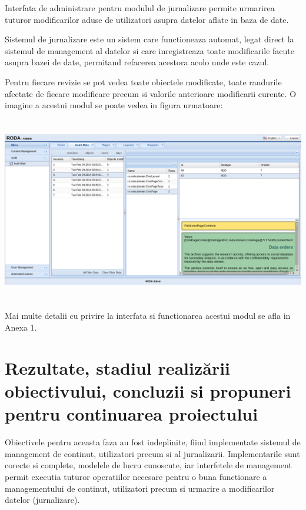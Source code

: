 \documentclass[a4paper, 10pt]{article}
\begin{document}
{Interfata de administrare pentru modulul de jurnalizare permite urmarirea tuturor modificarilor aduse de utilizatori asupra datelor aflate in baza de date. 

\bigskip

Sistemul de jurnalizare este un sistem care functioneaza automat, legat direct la sistemul de management al datelor si care inregistreaza toate modificarile facute asupra bazei de date, permitand refacerea acestora acolo unde este cazul. 



\bigskip

Pentru fiecare revizie se pot vedea toate obiectele modificate, toate randurile afectate de fiecare modificare precum si valorile anterioare modificarii curente. O imagine a acestui modul se poate vedea in figura urmatoare:

\begin{center}
\includegraphics[width=16.1cm,height=8.1cm]{audit.png}
\end{center}


Mai multe detalii cu privire la interfata si functionarea acestui modul se afla in Anexa 1.


\bigskip

\medskip

\clearpage

\section{Rezultate, stadiul realiz\u{a}rii obiectivului, concluzii si propuneri pentru continuarea proiectului}


\medskip

Obiectivele pentru aceasta faza au fost indeplinite, fiind implementate sistemul de management de continut, utilizatori precum si al jurnalizarii. 
Implementarile sunt corecte si complete, modelele de lucru cunoscute, iar interfetele de management permit executia tuturor operatiilor necesare pentru o buna functionare a managementului de continut, utilizatori precum si urmarire a modificarilor datelor (jurnalizare). 

}
\end{document}

